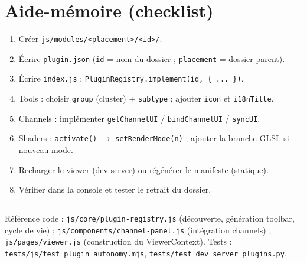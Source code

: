 \documentclass[11pt,a4paper]{article}
\newcommand{\code}[1]{\texttt{#1}}
\newcommand{\filepath}[1]{\texttt{\small #1}}
\begin{document}
\section{Aide-mémoire (checklist)}

\begin{enumerate}[leftmargin=2em]
  \item Créer \filepath{js/modules/<placement>/<id>/}.
  \item Écrire \filepath{plugin.json} (\code{id} = nom du dossier ; \code{placement}
        = dossier parent).
  \item Écrire \filepath{index.js} : \code{PluginRegistry.implement(id, \{ ... \})}.
  \item Tools : choisir \code{group} (cluster) + \code{subtype} ; ajouter
        \code{icon} et \code{i18nTitle}.
  \item Channels : implémenter \code{getChannelUI} / \code{bindChannelUI} /
        \code{syncUI}.
  \item Shaders : \code{activate()} $\rightarrow$ \code{setRenderMode(n)} ; ajouter
        la branche GLSL si nouveau mode.
  \item Recharger le viewer (dev server) ou régénérer le manifeste (statique).
  \item Vérifier dans la console et tester le retrait du dossier.
\end{enumerate}

\vfill
\hrule
\vspace{0.5em}
\noindent\small Référence code : \filepath{js/core/plugin-registry.js} (découverte,
génération toolbar, cycle de vie) ; \filepath{js/components/channel-panel.js}
(intégration channels) ; \filepath{js/pages/viewer.js} (construction du
ViewerContext). Tests : \filepath{tests/js/test\_plugin\_autonomy.mjs},
\filepath{tests/test\_dev\_server\_plugins.py}.
\end{document}
